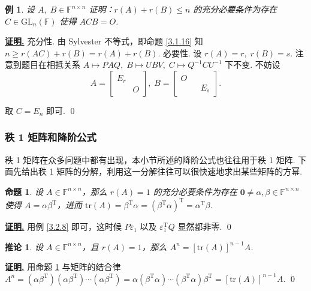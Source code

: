 \documentclass[10pt,openany]{article}
\theoremstyle{thmstyle} %
\theoremstyle{defstyle} %
\newtheorem{corollary}[theorem]{推论}
\theoremstyle{prostyle} %
\newtheorem{proposition}[theorem]{命题}
\theoremstyle{exastyle}
\newtheorem{example}[theorem]{例}
\theoremstyle{remstyle}
\renewenvironment{proof}[1][证明]{\par\underline{\textbf{#1.}} \;\fangsong}{\qed\par}
\newcommand{\T}{^{\text{T}}}
\newcommand{\F}{\mathbb{F}}
\newcommand{\gfn}{\text{GL}_n(\mathbb{F})}
\newcommand{\n}{^{n \times n}}
\newcommand{\tr}{\mathrm{tr}}
\begin{document}
\begin{example} \label{3.2.9}
	设 \( A, \; B \in \F\n \) 证明：\( r(A)+r(B) \leq n \) 的充分必要条件为存在 \( C \in \gfn \) 使得 \( ACB=O \).
\end{example}

\begin{proof}
	充分性. 由 Sylvester 不等式，即命题 \ref{3.1.16} 知 \( n \geq r(AC)+r(B)=r(A)+r(B) \). 必要性. 设 \( r(A)=r, \; r(B)=s \). 注意到题目在相抵关系 \( A \mapsto PAQ, \; B \mapsto UBV, \; C \mapsto Q^{-1}CU^{-1} \) 下不变. 不妨设 
	\[ A= \begin{bmatrix}
		E_r &  \\ & O 
	\end{bmatrix}, \; B=\begin{bmatrix}
	 O &  \\ & & E_s
	\end{bmatrix}.  \]
	
	取 \( C=E_n \) 即可.
\end{proof}

\subsubsection{秩 1 矩阵和降阶公式}

秩 1 矩阵在众多问题中都有出现，本小节所述的降阶公式也往往用于秩 1 矩阵. 下面先给出秩 1 矩阵的分解，利用这一分解往往可以很快速地求出某些矩阵的方幂.

\begin{proposition} \label{3.2.10}
	设 \( A \in \F\n \)，那么 \( r(A)=1 \) 的充分必要条件为存在 \( \bm{0} \neq \alpha, \beta \in \F\n \) 使得 \( A=\alpha \beta\T \)，进而 \( \tr(A)=\beta\T \alpha=(\beta\T \alpha)\T= \alpha\T \beta \).
\end{proposition}

\begin{proof}
	用例 \ref{3.2.8} 即可，这时候 \( P\varepsilon_1 \) 以及 \( \varepsilon_1\T Q \) 显然都非零.
\end{proof}

\begin{corollary}
	设 \( A \in \F\n \)，且 \( r(A)=1 \)，那么 \( A^n=[\tr(A)]^{n-1}A \).
\end{corollary}

\begin{proof}
	用命题 \ref{3.2.10} 与矩阵的结合律 \( A^n=(\alpha\beta\T)(\alpha \beta\T) \cdots (\alpha \beta\T)=\alpha(\beta\T \alpha) \cdots (\beta\T \alpha) \beta\T=[\tr(A)]^{n-1}A  \).
\end{proof}
\end{document}
